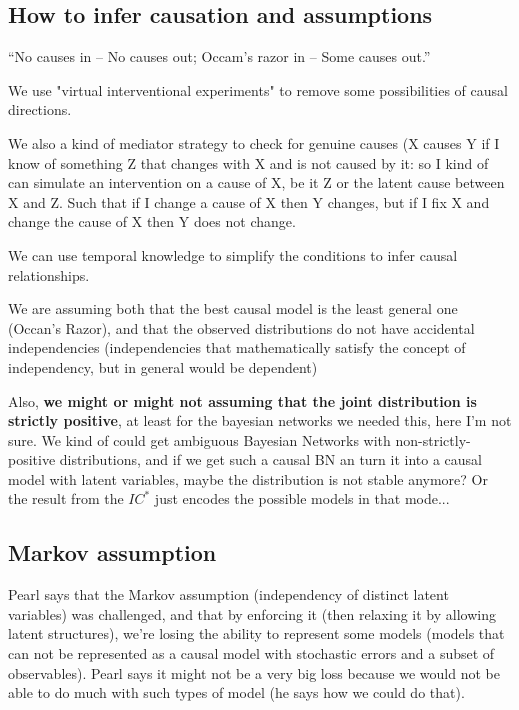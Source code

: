 \subsection{How to infer causation and assumptions}

“No causes in – No causes out; Occam’s razor in – Some causes out.”

We use "virtual interventional experiments" to remove some possibilities of causal directions.

We also a kind of mediator strategy to check for genuine causes (X causes Y if I know of something Z that changes with X and is not caused by it: so I kind of can simulate an intervention on a cause of X, be it Z or the latent cause between X and Z. Such that if I change a cause of X then Y changes, but if I fix X and change the cause of X then Y does not change.

We can use temporal knowledge to simplify the conditions to infer causal relationships.

We are assuming both that the best causal model is the least general one (Occan's Razor), and that the observed distributions do not have accidental independencies (independencies that mathematically satisfy the concept of independency, but in general would be dependent)

Also, \textbf{we might or might not assuming that the joint distribution is strictly positive}, at least for the bayesian networks we needed this, here I'm not sure. We kind of could get ambiguous Bayesian Networks with non-strictly-positive distributions, and if we get such a causal BN an turn it into a causal model with latent variables, maybe the distribution is not stable anymore? Or the result from the $IC^*$ just encodes the possible models in that  mode...

\subsection{Markov assumption}

Pearl says that the Markov assumption (independency of distinct latent variables) was challenged, and that by enforcing it (then relaxing it by allowing latent structures), we're losing the ability to represent some models (models that can not be represented as a causal model with stochastic errors and a subset of observables). Pearl says it might not be a very big loss because we would not be able to do much with such types of model (he says  how we could do that).

